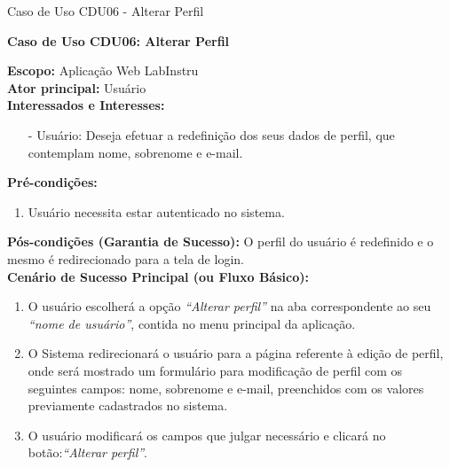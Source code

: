 \begin{quadro}[H]
	\centering
	\caption{Caso de Uso CDU06 - Alterar Perfil}

	\begin{framed}

		\textbf{Caso de Uso CDU06: Alterar Perfil}\\

		\begin{flushleft}

		\textbf{Escopo:} Aplicação Web LabInstru\\

		\textbf{Ator principal:} Usuário\\

		\textbf{Interessados e Interesses:}
		\begin{itemize}
			\item[-] Usuário: Deseja efetuar a redefinição dos seus dados de perfil, que contemplam nome, sobrenome e e-mail.
		\end{itemize}

		\textbf{Pré-condições:}\\
			 \begin{enumerate}
			 	\item{Usuário necessita estar autenticado no sistema.}
			 \end{enumerate}

		\textbf{Pós-condições (Garantia de Sucesso):} O perfil do usuário é redefinido e o mesmo é redirecionado para a tela de login.\\

		\textbf{Cenário de Sucesso Principal (ou Fluxo Básico):}\\
			\begin{enumerate}
			 	\item{O usuário escolherá a opção \textit{``Alterar perfil''} na aba correspondente ao seu \textit{``nome de usuário''}, contida no menu principal da aplicação.}
			 	\item{O Sistema redirecionará o usuário para a página referente à edição de perfil, onde será mostrado um formulário para modificação de perfil com os seguintes campos: nome, sobrenome e e-mail, preenchidos com os valores previamente cadastrados no sistema.}
			 	\item{O usuário modificará os campos que julgar necessário e clicará no botão:\textit{``Alterar perfil''}.}
			 \end{enumerate}


\end{flushleft}
\end{framed}
\end{quadro}
